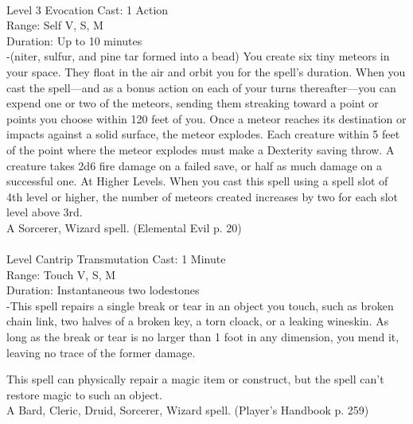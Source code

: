 \documentclass[10pt,twocolumn]{report}
\begin{document}
 \\
Level 3 \quad Evocation \quad Cast: 1 Action\\
Range: Self \quad V, S, M\\
Duration: Up to 10 minutes \quad \\
-(niter, sulfur, and pine tar formed into a bead)
You create six tiny meteors in your space. They float in the air and orbit you for the spell’s duration. When you cast the spell—and as a bonus action on each of your turns thereafter—you can expend one or two of the meteors, sending them streaking toward a point or points you choose within 120 feet of you. Once a meteor reaches its destination or impacts against a solid surface, the meteor explodes. Each creature within 5 feet of the point where the meteor explodes must make a Dexterity saving throw. A creature takes 2d6 fire damage on a failed save, or half as much damage on a successful one.
At Higher Levels. When you cast this spell using a spell slot of 4th level or higher, the number of meteors created increases by two for each slot level above 3rd.\\
A Sorcerer, Wizard spell. (Elemental Evil p. 20) \\


 \\
Level Cantrip \quad Transmutation \quad Cast: 1 Minute\\
Range: Touch \quad V, S, M\\
Duration: Instantaneous \quad two lodestones\\
-This spell repairs a single break or tear in an object you touch, such as broken chain link, two halves of a broken key, a torn cloack, or a leaking wineskin.
As long as the break or tear is no larger than 1 foot in any dimension, you mend it, leaving no trace of the former damage.

This spell can physically repair a magic item or construct, but the spell can’t restore magic to such an object.\\
A Bard, Cleric, Druid, Sorcerer, Wizard spell. (Player's Handbook p. 259) \\
\end{document}
